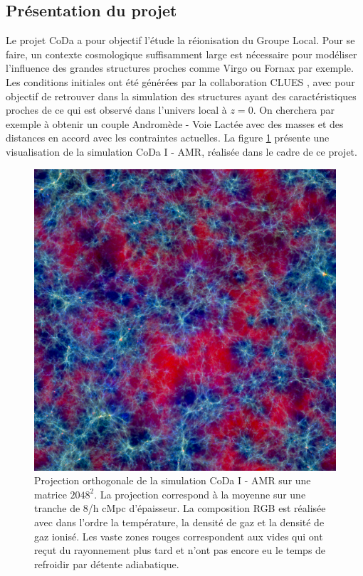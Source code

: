 \subsection{Présentation du projet}

Le projet \ac{CoDa} a pour objectif l’étude la réionisation du Groupe Local. %
Pour se faire, un contexte cosmologique suffisamment large est nécessaire pour modéliser l'influence des grandes structures proches comme Virgo ou Fornax par exemple.
Les conditions initiales ont été générées par la collaboration \ac{CLUES} \citep{2010arXiv1005.2687G}, avec pour objectif de retrouver dans la simulation des structures ayant des caractéristiques proches de ce qui est observé dans l'univers local à $z=0$.
On cherchera par exemple à obtenir un couple Andromède - Voie Lactée avec des masses et des distances en accord avec les contraintes actuelles.
La figure \ref{fig:ortho} présente une visualisation de la simulation CoDa I - AMR, réalisée dans le cadre de ce projet.

\begin{figure}
        \includegraphics[width=.95\textwidth]{img/04/rgb-compose.jpeg} 
        \caption[CODA I AMR]{Projection orthogonale de la simulation CoDa I - AMR sur une matrice $2048^2$.
        La projection correspond à la moyenne sur une tranche de 8/h cMpc d'épaisseur. 
        La composition RGB est réalisée avec dans l'ordre la température, la densité de gaz et la densité de gaz ionisé.
		Les vaste zones rouges correspondent aux vides qui ont reçut du rayonnement plus tard et n'ont pas encore eu le temps de refroidir par détente adiabatique.  
        }
 		\label{fig:ortho}
\end{figure}


